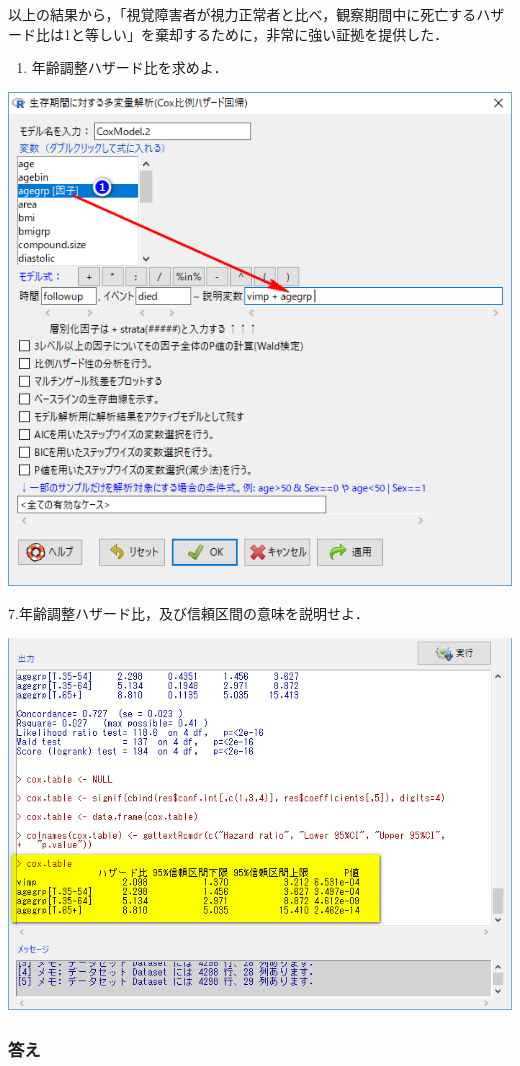 \documentclass[11pt,]{problemset}
\providecommand{\tightlist}{%
  \setlength{\itemsep}{0pt}\setlength{\parskip}{0pt}}
\begin{document}
以上の結果から，「視覚障害者が視力正常者と比べ，観察期間中に死亡するハザード比は1と等しい」を棄却するために，非常に強い証拠を提供した．

\begin{enumerate}
\def\labelenumi{\arabic{enumi}.}
\setcounter{enumi}{5}
\tightlist
\item
  年齢調整ハザード比を求めよ．
\end{enumerate}

\begin{center}\includegraphics[width=0.6\linewidth,height=0.4\textheight]{pic/survival18} \end{center}

7.年齢調整ハザード比，及び信頼区間の意味を説明せよ．

\begin{center}\includegraphics[width=0.6\linewidth,height=0.4\textheight]{pic/survival19} \end{center}

\hypertarget{-9}{%
\subsubsection{答え}\label{-9}}
\end{document}
